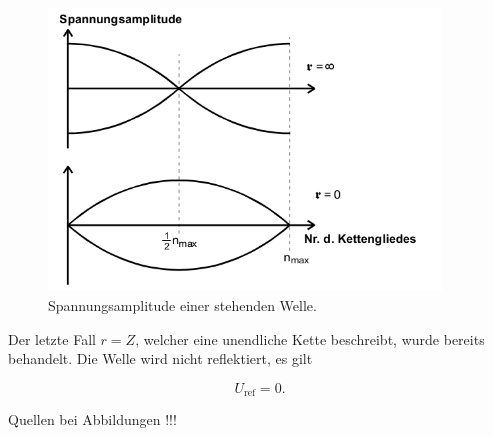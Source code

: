 \begin{figure}
  \centering
  \includegraphics[height = 7.5cm]{Reflexion.png}
  \caption{Spannungsamplitude einer stehenden Welle.}
  \label{fig:BauchKnot}
\end{figure}

Der letzte Fall $r=Z$, welcher eine unendliche Kette beschreibt, wurde bereits
behandelt. Die Welle wird nicht reflektiert, es gilt

\begin{equation}
  U_\text{ref} = 0.
\end{equation}

Quellen bei Abbildungen !!!

\cite{sample}
